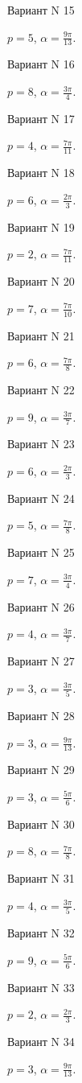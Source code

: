 \documentclass[11pt]{report}
\begin{document}
Вариант N 15

$p = 5$, $\alpha = \frac{9 \pi}{13}$.

Вариант N 16

$p = 8$, $\alpha = \frac{3 \pi}{4}$.

Вариант N 17

$p = 4$, $\alpha = \frac{7 \pi}{11}$.

Вариант N 18

$p = 6$, $\alpha = \frac{2 \pi}{3}$.

Вариант N 19

$p = 2$, $\alpha = \frac{7 \pi}{11}$.

Вариант N 20

$p = 7$, $\alpha = \frac{7 \pi}{10}$.

Вариант N 21

$p = 6$, $\alpha = \frac{7 \pi}{8}$.

Вариант N 22

$p = 9$, $\alpha = \frac{3 \pi}{7}$.

Вариант N 23

$p = 6$, $\alpha = \frac{2 \pi}{3}$.

Вариант N 24

$p = 5$, $\alpha = \frac{7 \pi}{8}$.

Вариант N 25

$p = 7$, $\alpha = \frac{3 \pi}{4}$.

Вариант N 26

$p = 4$, $\alpha = \frac{3 \pi}{7}$.

Вариант N 27

$p = 3$, $\alpha = \frac{3 \pi}{5}$.

Вариант N 28

$p = 3$, $\alpha = \frac{9 \pi}{13}$.

Вариант N 29

$p = 3$, $\alpha = \frac{5 \pi}{6}$.

Вариант N 30

$p = 8$, $\alpha = \frac{7 \pi}{8}$.

Вариант N 31

$p = 4$, $\alpha = \frac{3 \pi}{5}$.

Вариант N 32

$p = 9$, $\alpha = \frac{5 \pi}{6}$.

Вариант N 33

$p = 2$, $\alpha = \frac{2 \pi}{3}$.

Вариант N 34

$p = 3$, $\alpha = \frac{9 \pi}{13}$.
\end{document}
